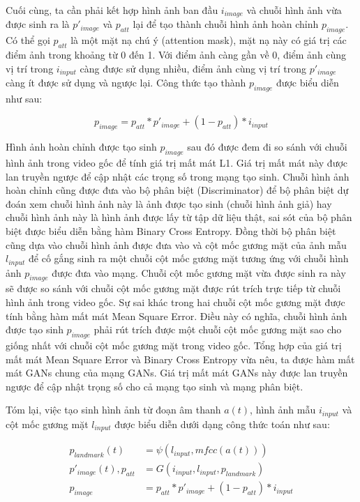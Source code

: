 Cuối cùng, ta cần phải kết hợp hình ảnh ban đầu $i_{image}$ và chuỗi hình ảnh vừa được sinh ra là $p'_{image}$ và $p_{att}$ lại để tạo thành chuỗi hình ảnh hoàn chỉnh $p_{image}$. Có thể gọi $p_{att}$ là một mặt nạ chú ý (attention mask), mặt nạ này có giá trị các điểm ảnh trong khoảng từ 0 đến 1. Với điểm ảnh càng gần về 0, điểm ảnh cùng vị trí trong $i_{input}$ càng được sử dụng nhiều, điểm ảnh cùng vị trí trong $p'_{image}$ càng ít được sử dụng và ngược lại. Công thức tạo thành $p_{image}$ được biểu diễn như sau:

\begin{equation}
    p_{image}=p_{att}*p'_{image}+(1-p_{att})*i_{input}
\end{equation}

Hình ảnh hoàn chỉnh được tạo sinh $p_{image}$ sau đó được đem đi so sánh với chuỗi hình ảnh trong video gốc để tính giá trị mất mát L1. Giá trị mất mát này được lan truyền ngược để cập nhật các trọng số trong mạng tạo sinh. Chuỗi hình ảnh hoàn chỉnh cũng được đưa vào bộ phân biệt (Discriminator) để bộ phân biệt dự đoán xem chuỗi hình ảnh này là ảnh được tạo sinh (chuỗi hình ảnh giả) hay chuỗi hình ảnh này là hình ảnh được lấy từ tập dữ liệu thật, sai sót của bộ phân biệt được biểu diễn bằng hàm Binary Cross Entropy. Đồng thời bộ phân biệt cũng dựa vào chuỗi hình ảnh được đưa vào và cột mốc gương mặt của ảnh mẫu $l_{input}$ để cố gắng sinh ra một chuỗi cột mốc gương mặt tương ứng với chuỗi hình ảnh $p_{image}$ được đưa vào mạng. Chuỗi cột mốc gương mặt vừa được sinh ra này sẽ được so sánh với chuỗi cột mốc gương mặt được rút trích trực tiếp từ chuỗi hình ảnh trong video gốc. Sự sai khác trong hai chuỗi cột mốc gương mặt được tính bằng hàm mất mát Mean Square Error. Điều này có nghĩa, chuỗi hình ảnh được tạo sinh $p_{image}$ phải rút trích được một chuỗi cột mốc gương mặt sao cho giống nhất với chuỗi cột mốc gương mặt trong video gốc. Tổng hợp của giá trị mất mát Mean Square Error và Binary Cross Entropy vừa nêu, ta được hàm mất mát GANs chung của mạng GANs. Giá trị mất mát GANs này được lan truyền ngược để cập nhật trọng số cho cả mạng tạo sinh và mạng phân biệt.

Tóm lại, việc tạo sinh hình ảnh từ đoạn âm thanh $a(t)$, hình ảnh mẫu $i_{input}$ và cột mốc gương mặt $l_{input}$ được biểu diễn dưới dạng công thức toán như sau:

\begin{equation}
    \begin{split}
    p_{landmark}(t) &= \psi(l_{input}, mfcc(a(t)))\\
    p'_{image}(t), p_{att} &= G(i_{input}, l_{input}, p_{landmark})\\
    p_{image} &= p_{att}*p'_{image}+(1-p_{att})*i_{input}
    \end{split}
\end{equation}

